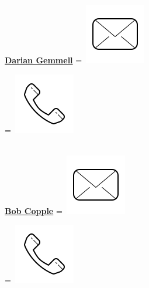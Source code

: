 \documentclass[]{latex/resume}
\begin{document}
\begin{minipage}[t]{0.25\textwidth}
    \href{https://www.linkedin.com}{\textbf{Darian Gemmell}} 
    \begingroup
        =\hbox{
            \includegraphics[scale=0.1,trim={0 1cm 0cm 0cm}]{latex/icons/mail.png} 
        }
        \parbox{\wd0}{}
    \endgroup
    \begingroup
        =\hbox{ \includegraphics[scale=0.1,trim={0 1.25cm -0.4cm 0cm}]{latex/icons/phone.png}\hspace{0.2cm} }
        \parbox{\wd0}{}
    \endgroup \\

    \href{https://www.linkedin.com/in/bob-copple-8804a713/}{\textbf{Bob Copple}} 
    \begingroup
        =\hbox{
            \includegraphics[scale=0.1,trim={0 1cm 0cm 0cm}]{latex/icons/mail.png} 
        }
        \parbox{\wd0}{}
    \endgroup
    \begingroup
        =\hbox{ \includegraphics[scale=0.1,trim={0 1.25cm -0.4cm 0cm}]{latex/icons/phone.png}\hspace{0.2cm} }
        \parbox{\wd0}{}
    \endgroup \\


\end{minipage}
\end{document}
